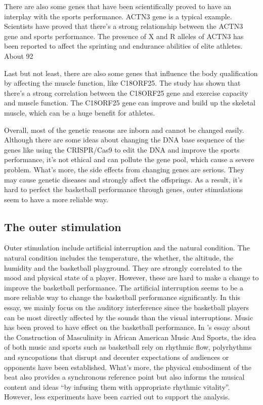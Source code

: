 \documentclass{article}
\begin{document}
There are also some genes that have been scientifically proved to have an interplay with the sports performance. ACTN3 gene is a typical example. Scientists have proved that there's a strong relationship between the ACTN3 gene and sports performance. The presence of X and R alleles of ACTN3 has been reported to affect the sprinting and endurance abilities of elite athletes. About 92%

Last but not least, there are also some genes that influence the body qualification by affecting the muscle function, like C18ORF25. The study has shown that there's a strong correlation between the C18ORF25 gene and exercise capacity and muscle function. The C18ORF25 gene can improve and build up the skeletal muscle, which can be a huge benefit for athletes.\autocite{blazevPhosphoproteomicsThreeExercise2022}

Overall, most of the genetic reasons are inborn and cannot be changed easily. Although there are some ideas about changing the DNA base sequence of the genes like using the CRISPR/Cas9 to edit the DNA and improve the sports performance, it's not ethical and can pollute the gene pool, which cause a severe problem. What's more, the side effects from changing genes are serious. They may cause genetic diseases and strongly affect the offsprings. As a result, it's hard to perfect the basketball performance through genes, outer stimulations seem to have a more reliable way. 

\subsection{The outer stimulation}
Outer stimulation include artificial interruption and the natural condition. The natural condition includes the temperature, the whether, the altitude, the humidity and the basketball playground. They are strongly correlated to the mood and physical state of a player. However, these are hard to make a change to improve the basketball performance. The artificial interruption seems to be a more reliable way to change the basketball performance significantly. In this essay, we mainly focus on the auditory interference since the basketball players can be most directly affected by the sounds than the visual interruptions. \todo{()} Music has been proved to have effect on the basketball performance. In \textcite{mcleodConstructionMasculinityAfrican2009}'s essay about the Construction of Masculinity in African American Music And Sports, the idea of both music and sports such as basketball rely on rhythmic flow, polyrhythms and syncopations that disrupt and decenter expectations of audiences or opponents have been established. What's more, the physical embodiment of the beat also provides a synchronous reference point but also informs the musical content and ideas ``by infusing them with appropriate rhythmic vitality''. However, less experiments have been carried out to support the analysis. 
\end{document}
